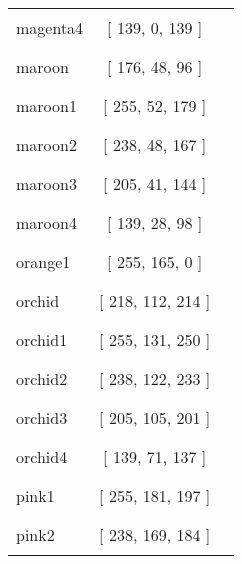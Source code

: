 \begin{tabular}{|l|c|c|}
magenta4 & [ 139, 0, 139 ] & \color{magenta4} \rule{1cm}{1.5ex}\\
maroon & [ 176, 48, 96 ] & \color{maroon} \rule{1cm}{1.5ex}\\
maroon1 & [ 255, 52, 179 ] & \color{maroon1} \rule{1cm}{1.5ex}\\
maroon2 & [ 238, 48, 167 ] & \color{maroon2} \rule{1cm}{1.5ex}\\
maroon3 & [ 205, 41, 144 ] & \color{maroon3} \rule{1cm}{1.5ex}\\
maroon4 & [ 139, 28, 98 ] & \color{maroon4} \rule{1cm}{1.5ex}\\
orange1 & [ 255, 165, 0 ] & \color{orange1} \rule{1cm}{1.5ex}\\
orchid & [ 218, 112, 214 ] & \color{orchid} \rule{1cm}{1.5ex}\\
orchid1 & [ 255, 131, 250 ] & \color{orchid1} \rule{1cm}{1.5ex}\\
orchid2 & [ 238, 122, 233 ] & \color{orchid2} \rule{1cm}{1.5ex}\\
orchid3 & [ 205, 105, 201 ] & \color{orchid3} \rule{1cm}{1.5ex}\\
orchid4 & [ 139, 71, 137 ] & \color{orchid4} \rule{1cm}{1.5ex}\\
pink1 & [ 255, 181, 197 ] & \color{pink1} \rule{1cm}{1.5ex}\\
pink2 & [ 238, 169, 184 ] & \color{pink2} \rule{1cm}{1.5ex}\\
\end{tabular}



